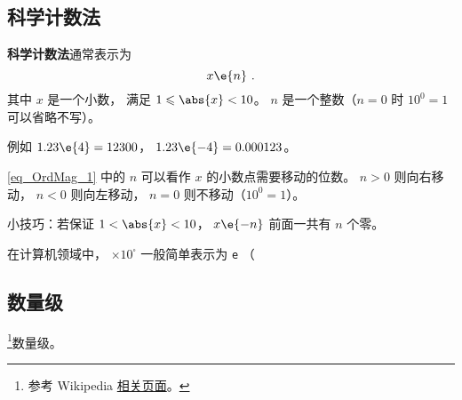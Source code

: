 
\begin{issues}
\issueDraft
\end{issues}

\subsection{科学计数法}
\textbf{科学计数法}通常表示为
\begin{equation}\label{eq_OrdMag_1}
x \e{n}~.
\end{equation}
其中 $x$ 是一个小数， 满足 $1 \leqslant \abs{x} < 10$。 $n$ 是一个整数（$n=0$ 时 $10^{0} = 1$ 可以省略不写）。

例如 $1.23\e{4} = 12300$， $1.23\e{-4} = 0.000123$。

\autoref{eq_OrdMag_1} 中的 $n$ 可以看作 $x$ 的小数点需要移动的位数。 $n > 0$ 则向右移动， $n < 0$ 则向左移动， $n=0$ 则不移动（$10^{0} = 1$）。

小技巧：若保证 $1 < \abs{x} < 10$， $x\e{-n}$ 前面一共有 $n$ 个零。

在计算机领域中， $\times 10^\square$ 一般简单表示为 \verb`e` （

\subsection{数量级}
\footnote{参考 Wikipedia \href{https://en.wikipedia.org/wiki/Order_of_magnitude}{相关页面}。}数量级。
